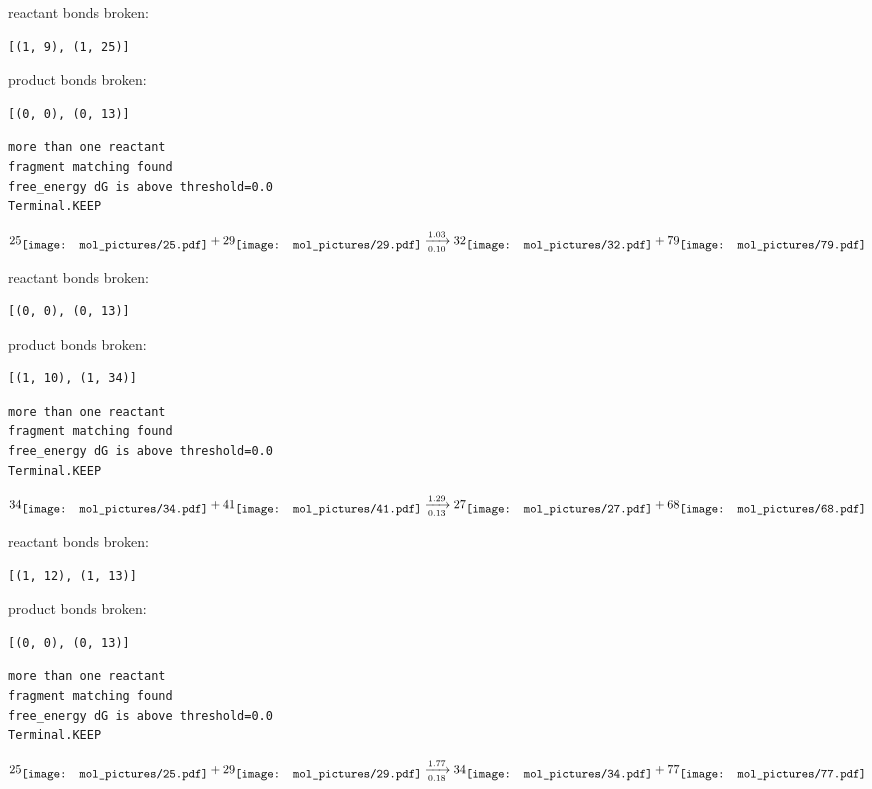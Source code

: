 \documentclass{article}
\begin{document}
reactant bonds broken:\begin{verbatim}
[(1, 9), (1, 25)]
\end{verbatim}
product bonds broken:\begin{verbatim}
[(0, 0), (0, 13)]
\end{verbatim}




\vspace{1cm}
\begin{verbatim}
more than one reactant
fragment matching found
free_energy dG is above threshold=0.0
Terminal.KEEP
\end{verbatim}
$$
25
\raisebox{-.5\height}{\texttt{[image: mol\_pictures/25.pdf]}}
+
29
\raisebox{-.5\height}{\texttt{[image: mol\_pictures/29.pdf]}}
\xrightarrow[0.10]{1.03}
32
\raisebox{-.5\height}{\texttt{[image: mol\_pictures/32.pdf]}}
+
79
\raisebox{-.5\height}{\texttt{[image: mol\_pictures/79.pdf]}}
$$


reactant bonds broken:\begin{verbatim}
[(0, 0), (0, 13)]
\end{verbatim}
product bonds broken:\begin{verbatim}
[(1, 10), (1, 34)]
\end{verbatim}




\vspace{1cm}
\begin{verbatim}
more than one reactant
fragment matching found
free_energy dG is above threshold=0.0
Terminal.KEEP
\end{verbatim}
$$
34
\raisebox{-.5\height}{\texttt{[image: mol\_pictures/34.pdf]}}
+
41
\raisebox{-.5\height}{\texttt{[image: mol\_pictures/41.pdf]}}
\xrightarrow[0.13]{1.29}
27
\raisebox{-.5\height}{\texttt{[image: mol\_pictures/27.pdf]}}
+
68
\raisebox{-.5\height}{\texttt{[image: mol\_pictures/68.pdf]}}
$$


reactant bonds broken:\begin{verbatim}
[(1, 12), (1, 13)]
\end{verbatim}
product bonds broken:\begin{verbatim}
[(0, 0), (0, 13)]
\end{verbatim}




\vspace{1cm}
\begin{verbatim}
more than one reactant
fragment matching found
free_energy dG is above threshold=0.0
Terminal.KEEP
\end{verbatim}
$$
25
\raisebox{-.5\height}{\texttt{[image: mol\_pictures/25.pdf]}}
+
29
\raisebox{-.5\height}{\texttt{[image: mol\_pictures/29.pdf]}}
\xrightarrow[0.18]{1.77}
34
\raisebox{-.5\height}{\texttt{[image: mol\_pictures/34.pdf]}}
+
77
\raisebox{-.5\height}{\texttt{[image: mol\_pictures/77.pdf]}}
$$
\end{document}
